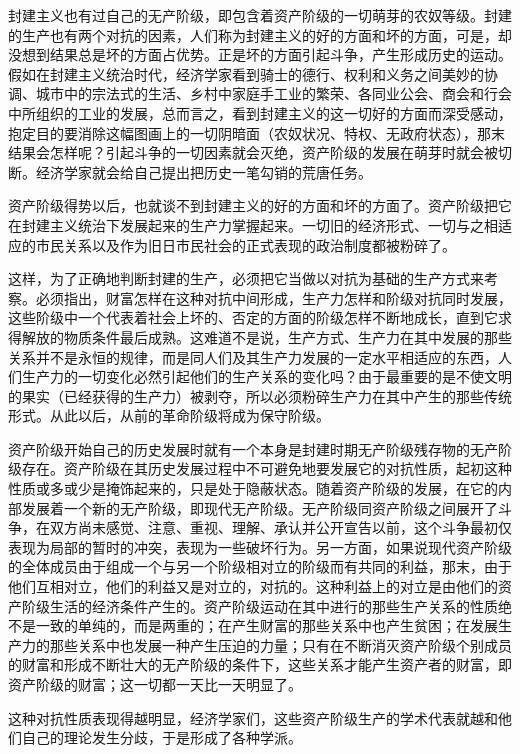 \documentclass[a4paper,twoside,12pt]{ctexart}
\begin{document}
封建主义也有过自己的无产阶级，即包含着资产阶级的一切萌芽的农奴等级。封建的生产也有两个对抗的因素，人们称为封建主义的好的方面和坏的方面，可是，却没想到结果总是坏的方面占优势。正是坏的方面引起斗争，产生形成历史的运动。假如在封建主义统治时代，经济学家看到骑士的德行、权利和义务之间美妙的协调、城市中的宗法式的生活、乡村中家庭手工业的繁荣、各同业公会、商会和行会中所组织的工业的发展，总而言之，看到封建主义的这一切好的方面而深受感动，抱定目的要消除这幅图画上的一切阴暗面（农奴状况、特权、无政府状态），那末结果会怎样呢？引起斗争的一切因素就会灭绝，资产阶级的发展在萌芽时就会被切断。经济学家就会给自己提出把历史一笔勾销的荒唐任务。

资产阶级得势以后，也就谈不到封建主义的好的方面和坏的方面了。资产阶级把它在封建主义统治下发展起来的生产力掌握起来。一切旧的经济形式、一切与之相适应的市民关系以及作为旧日市民社会的正式表现的政治制度都被粉碎了。

这样，为了正确地判断封建的生产，必须把它当做以对抗为基础的生产方式来考察。必须指出，财富怎样在这种对抗中间形成，生产力怎样和阶级对抗同时发展，这些阶级中一个代表着社会上坏的、否定的方面的阶级怎样不断地成长，直到它求得解放的物质条件最后成熟。这难道不是说，生产方式、生产力在其中发展的那些关系并不是永恒的规律，而是同人们及其生产力发展的一定水平相适应的东西，人们生产力的一切变化必然引起他们的生产关系的变化吗？由于最重要的是不使文明的果实（已经获得的生产力）被剥夺，所以必须粉碎生产力在其中产生的那些传统形式。从此以后，从前的革命阶级将成为保守阶级。

资产阶级开始自己的历史发展时就有一个本身是封建时期无产阶级残存物的无产阶级存在。资产阶级在其历史发展过程中不可避免地要发展它的对抗性质，起初这种性质或多或少是掩饰起来的，只是处于隐蔽状态。随着资产阶级的发展，在它的内部发展着一个新的无产阶级，即现代无产阶级。无产阶级同资产阶级之间展开了斗争，在双方尚未感觉、注意、重视、理解、承认并公开宣告以前，这个斗争最初仅表现为局部的暂时的冲突，表现为一些破坏行为。另一方面，如果说现代资产阶级的全体成员由于组成一个与另一个阶级相对立的阶级而有共同的利益，那末，由于他们互相对立，他们的利益又是对立的，对抗的。这种利益上的对立是由他们的资产阶级生活的经济条件产生的。资产阶级运动在其中进行的那些生产关系的性质绝不是一致的单纯的，而是两重的；在产生财富的那些关系中也产生贫困；在发展生产力的那些关系中也发展一种产生压迫的力量；只有在不断消灭资产阶级个别成员的财富和形成不断壮大的无产阶级的条件下，这些关系才能产生资产者的财富，即资产阶级的财富；这一切都一天比一天明显了。

这种对抗性质表现得越明显，经济学家们，这些资产阶级生产的学术代表就越和他们自己的理论发生分歧，于是形成了各种学派。
\end{document}
